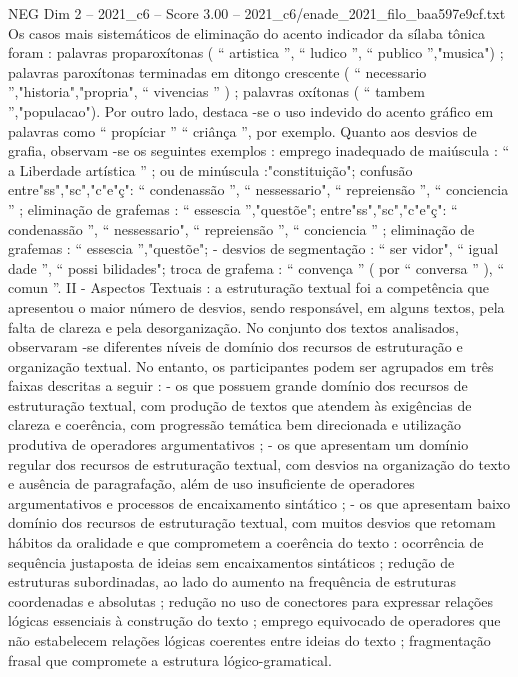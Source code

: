 \begin{textsample}{NEG Dim 2 – 2021\_c6 – Score 3.00 – 2021\_c6/enade\_2021\_filo\_baa597e9cf.txt}
Os casos mais sistemáticos de eliminação do acento indicador da sílaba tônica foram : palavras proparoxítonas ( “ artistica ”, “ ludico ”, “ publico ”,"musica") ; palavras paroxítonas terminadas em ditongo crescente ( “ necessario ”,"historia","propria", “ vivencias ” ) ; palavras oxítonas ( “ tambem ”,"populacao").
Por outro lado, destaca -se o uso indevido do acento gráfico em palavras como “ propíciar ” “ criânça ”, por exemplo.
Quanto aos desvios de grafia, observam -se os seguintes exemplos : emprego inadequado de maiúscula : “ a Liberdade artística ” ; ou de minúscula :"constituição"; confusão entre"ss","sc","c"e"ç": “ condenassão ”, “ nessessario", “ repreiensão ”, “ conciencia ” ; eliminação de grafemas : “ essescia ”,"questõe"; entre"ss","sc","c"e"ç": “ condenassão ”, “ nessessario", “ repreiensão ”, “ conciencia ” ; eliminação de grafemas : “ essescia ”,"questõe"; - desvios de segmentação : “ ser vidor", “ igual dade ”, “ possi bilidades"; troca de grafema : “ convença ” ( por “ conversa ” ), “ comun ”.
II - Aspectos Textuais : a estruturação textual foi a competência que apresentou o maior número de desvios, sendo responsável, em alguns textos, pela falta de clareza e pela desorganização.
No conjunto dos textos analisados, observaram -se diferentes níveis de domínio dos recursos de estruturação e organização textual.
No entanto, os participantes podem ser agrupados em três faixas descritas a seguir : - os que possuem grande domínio dos recursos de estruturação textual, com produção de textos que atendem às exigências de clareza e coerência, com progressão temática bem direcionada e utilização produtiva de operadores argumentativos ; - os que apresentam um domínio regular dos recursos de estruturação textual, com desvios na organização do texto e ausência de paragrafação, além de uso insuficiente de operadores argumentativos e processos de encaixamento sintático ; - os que apresentam baixo domínio dos recursos de estruturação textual, com muitos desvios que retomam hábitos da oralidade e que comprometem a coerência do texto : ocorrência de sequência justaposta de ideias sem encaixamentos sintáticos ; redução de estruturas subordinadas, ao lado do aumento na frequência de estruturas coordenadas e absolutas ; redução no uso de conectores para expressar relações lógicas essenciais à construção do texto ; emprego equivocado de operadores que não estabelecem relações lógicas coerentes entre ideias do texto ; fragmentação frasal que compromete a estrutura lógico-gramatical.

\end{textsample}
